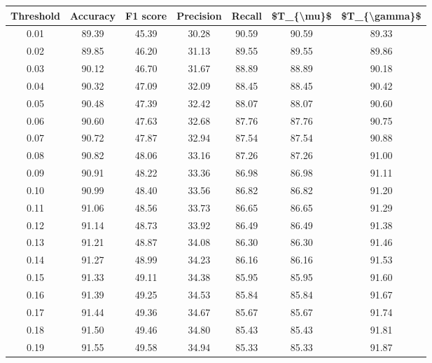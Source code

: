 \begin{tabular}{|c|c|c|c|c|c|c|}
\hline
 Threshold &  Accuracy &  F1 score &  Precision &  Recall &  \$T\_\{\textbackslash mu\}\$ &  \$T\_\{\textbackslash gamma\}\$ \\
\hline
      0.01 &     89.39 &     45.39 &      30.28 &   90.59 &      90.59 &         89.33 \\
      0.02 &     89.85 &     46.20 &      31.13 &   89.55 &      89.55 &         89.86 \\
      0.03 &     90.12 &     46.70 &      31.67 &   88.89 &      88.89 &         90.18 \\
      0.04 &     90.32 &     47.09 &      32.09 &   88.45 &      88.45 &         90.42 \\
      0.05 &     90.48 &     47.39 &      32.42 &   88.07 &      88.07 &         90.60 \\
      0.06 &     90.60 &     47.63 &      32.68 &   87.76 &      87.76 &         90.75 \\
      0.07 &     90.72 &     47.87 &      32.94 &   87.54 &      87.54 &         90.88 \\
      0.08 &     90.82 &     48.06 &      33.16 &   87.26 &      87.26 &         91.00 \\
      0.09 &     90.91 &     48.22 &      33.36 &   86.98 &      86.98 &         91.11 \\
      0.10 &     90.99 &     48.40 &      33.56 &   86.82 &      86.82 &         91.20 \\
      0.11 &     91.06 &     48.56 &      33.73 &   86.65 &      86.65 &         91.29 \\
      0.12 &     91.14 &     48.73 &      33.92 &   86.49 &      86.49 &         91.38 \\
      0.13 &     91.21 &     48.87 &      34.08 &   86.30 &      86.30 &         91.46 \\
      0.14 &     91.27 &     48.99 &      34.23 &   86.16 &      86.16 &         91.53 \\
      0.15 &     91.33 &     49.11 &      34.38 &   85.95 &      85.95 &         91.60 \\
      0.16 &     91.39 &     49.25 &      34.53 &   85.84 &      85.84 &         91.67 \\
      0.17 &     91.44 &     49.36 &      34.67 &   85.67 &      85.67 &         91.74 \\
      0.18 &     91.50 &     49.46 &      34.80 &   85.43 &      85.43 &         91.81 \\
      0.19 &     91.55 &     49.58 &      34.94 &   85.33 &      85.33 &         91.87 \\

\end{tabular}

